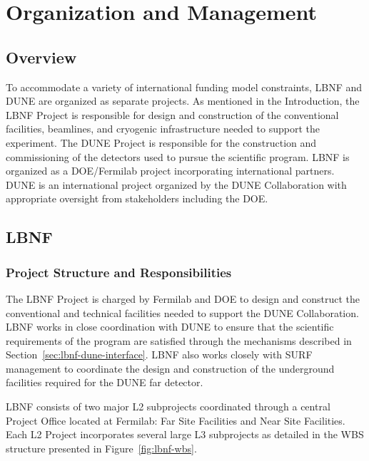 \chapter{Organization and Management}
\label{v1ch:org-mgmt}

\section{Overview}

To accommodate a variety of international funding model constraints, LBNF and DUNE are organized as separate projects. As mentioned in the Introduction, the LBNF Project is responsible for design and construction of the conventional facilities, beamlines, and cryogenic infrastructure needed to support the experiment.  The DUNE Project is responsible for the construction and commissioning of the detectors used to pursue the scientific program.  LBNF is organized as a DOE/Fermilab project incorporating international partners.   DUNE is an international project organized by the DUNE Collaboration with appropriate oversight from stakeholders including the DOE.

\section{LBNF}

\subsection{Project Structure and Responsibilities}

The LBNF Project is charged by Fermilab and DOE to design and construct the conventional and technical facilities needed to support the DUNE Collaboration.  LBNF works in close coordination with DUNE to ensure that the scientific requirements of the program are satisfied through the mechanisms described in Section~\ref{sec:lbnf-dune-interface}. LBNF also works closely with SURF management to coordinate the design and construction of the underground facilities required for the DUNE far detector. 

LBNF consists of two major L2 subprojects coordinated through a central Project Office located at Fermilab: Far Site Facilities and Near Site Facilities. Each L2 Project incorporates several large L3 subprojects as detailed in the WBS structure presented in Figure~\ref{fig:lbnf-wbs}.

